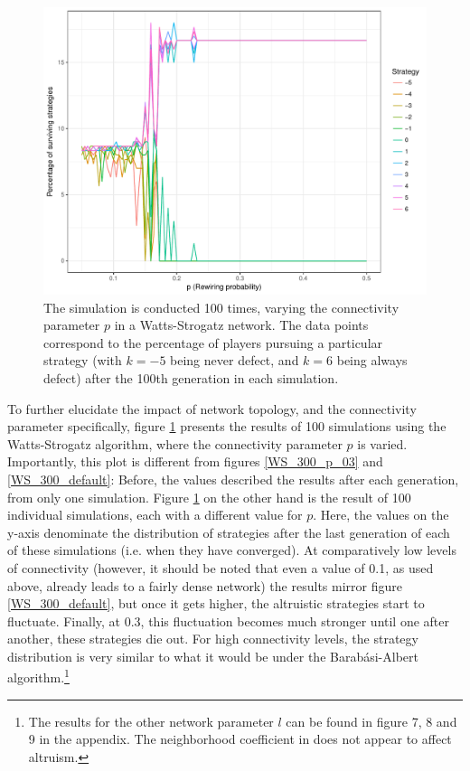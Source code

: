 \documentclass[12pt]{article}
\begin{document}
\begin{figure}
    \centering
    \includegraphics[width=\linewidth]{../figures/results_WS_300_p_100sims.pdf}
    \caption{The simulation is conducted 100 times, varying the connectivity parameter $p$ in a Watts-Strogatz network. The data points correspond to the percentage of players pursuing a particular strategy (with $k=-5$ being never defect, and $k=6$ being always defect) after the 100th generation in each simulation.}
    \label{WS_300_p_100sims}
\end{figure}

To further elucidate the impact of network topology, and the connectivity parameter specifically, figure \ref{WS_300_p_100sims} presents the results of 100 simulations using the Watts-Strogatz algorithm, where the connectivity parameter $p$ is varied. Importantly, this plot is different from  figures \ref{WS_300_p_03} and \ref{WS_300_default}: Before, the values described the results after each generation, from only one simulation. Figure \ref{WS_300_p_100sims} on the other hand is the result of 100 individual simulations, each with a different value for $p$. Here, the values on the y-axis denominate the distribution of strategies after the last generation of each of these simulations (i.e. when they have converged). At comparatively low levels of connectivity (however, it should be noted that even a value of 0.1, as used above, already leads to a fairly dense network) the results mirror figure \ref{WS_300_default}, but once it gets higher, the altruistic strategies start to fluctuate. Finally, at 0.3, this fluctuation becomes much stronger until one after another, these strategies die out. For high connectivity levels, the strategy distribution is very similar to what it would be under the Barab\'{a}si-Albert algorithm.\footnote{The results for the other network parameter $l$ can be found in figure 7, 8 and 9 in the appendix. The neighborhood coefficient in does not appear to affect altruism.}
\end{document}
